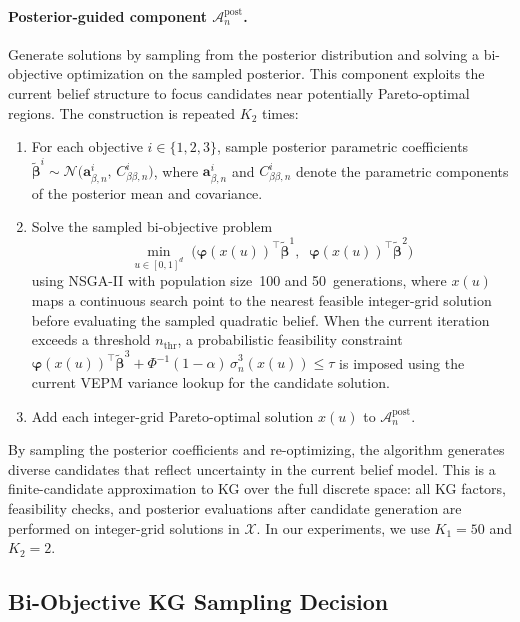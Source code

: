\documentclass[12pt]{article}
\theoremstyle{plain}
\theoremstyle{definition}
\theoremstyle{remark}
\begin{document}
\paragraph{Posterior-guided component $\mathcal{A}_n^{\mathrm{post}}$.}
Generate solutions by sampling from the posterior distribution and solving a bi-objective optimization on the sampled posterior.  This component exploits the current belief structure to focus candidates near potentially Pareto-optimal regions.  The construction is repeated $K_2$ times:
\begin{enumerate}
  \item For each objective $i \in \{1, 2, 3\}$, sample posterior parametric coefficients $\tilde{\boldsymbol{\beta}}^i \sim \mathcal{N}\!\bigl(\mathbf{a}^i_{\beta,n},\, C^i_{\beta\beta,n}\bigr)$, where $\mathbf{a}^i_{\beta,n}$ and $C^i_{\beta\beta,n}$ denote the parametric components of the posterior mean and covariance.
  \item Solve the sampled bi-objective problem
  \begin{equation}\label{eq:sampled_biobj}
    \min_{u \in [0,1]^d}\; \bigl(\boldsymbol{\varphi}(x(u))^\top \tilde{\boldsymbol{\beta}}^1,\;\; \boldsymbol{\varphi}(x(u))^\top \tilde{\boldsymbol{\beta}}^2\bigr)
  \end{equation}
  using NSGA-II with population size~100 and 50~generations, where $x(u)$ maps a continuous search point to the nearest feasible integer-grid solution before evaluating the sampled quadratic belief.  When the current iteration exceeds a threshold $n_{\mathrm{thr}}$, a probabilistic feasibility constraint $\boldsymbol{\varphi}(x(u))^\top \tilde{\boldsymbol{\beta}}^3 + \Phi^{-1}(1-\alpha)\,\hat{\sigma}^3_n(x(u)) \le \tau$ is imposed using the current VEPM variance lookup for the candidate solution.
  \item Add each integer-grid Pareto-optimal solution $x(u)$ to $\mathcal{A}_n^{\mathrm{post}}$.
\end{enumerate}
By sampling the posterior coefficients and re-optimizing, the algorithm generates diverse candidates that reflect uncertainty in the current belief model.  This is a finite-candidate approximation to KG over the full discrete space: all KG factors, feasibility checks, and posterior evaluations after candidate generation are performed on integer-grid solutions in $\mathcal{X}$.  In our experiments, we use $K_1 = 50$ and $K_2 = 2$.


\subsection{Bi-Objective KG Sampling Decision}\label{subsec:biobj_KG}
\end{document}
